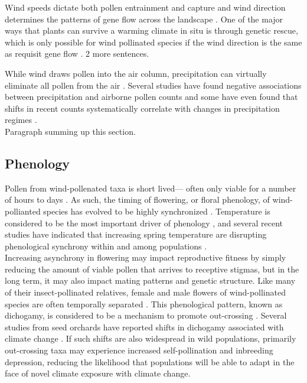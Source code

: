 \documentclass[11pt]{article}
\begin{document}
\noindent Wind speeds dictate both pollen entrainment and capture \citep{} and wind direction determines the patterns of gene flow across the landscape \citep{}. One of the major ways that plants can survive a warming climate in situ is through genetic rescue, which is only possible for wind pollinated species if the wind direction is the same as requisit gene flow \citep{Kling2020}. 2 more sentences.

\noindent While wind draws pollen into the air column, precipitation can virtually eliminate all pollen from the air \citep{Niklas1985,Kluska:2020aa}. Several studies have found negative associations between precipitation and airborne pollen counts \citep{Grewling:2014aa,Gross2019,Pace:2018aa} and some have even found that shifts in recent counts systematically correlate with changes in precipitation regimes \citep{Zhang:2015, Bruffaerts:2018aa}.\\ 

\noindent Paragraph summing up this section.\\


\subsection*{Phenology}
\noindent Pollen from wind-pollenated taxa is short lived--- often only viable for a number of hours to days \citep{}. As such, the timing of flowering, or floral phenology, of wind-pollianted species has evolved to be highly synchronized \citep{}. Temperature is considered to be the most important driver of phenology \citep{}, and several recent studies have indicated that increasing spring temperature are disrupting phenological synchrony within and among populations \citep{}.\\ 

Increasing asynchrony in flowering may impact reproductive fitness by simply reducing the amount of viable pollen that arrives to receptive stigmas, but in the long term, it may also impact mating patterns and genetic structure. Like many of their insect-pollinated relatives, female and male flowers of wind-pollinated species are often temporally separated \citep{Bertin:1993aa}. This phenological pattern, known as dichogamy, is considered to be a mechanism to promote out-crossing \citep{Bertin:1993ab}. Several studies from seed orchards have reported shifts in dichogamy associated with climate change \citep{Alizoti2010,Mutke:2005aa,Elkassaby1991}. If such shifts are also widespread in wild populations, primarily out-crossing taxa may experience increased self-pollination and inbreeding depression, reducing the likelihood that populations will be able to adapt in the face of novel climate exposure with climate change.
\end{document}
